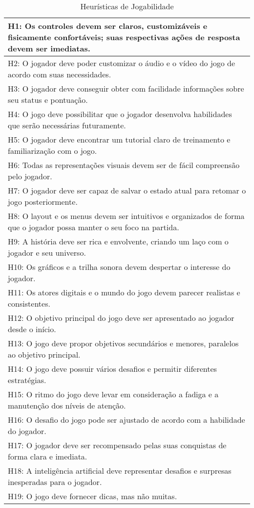 \begin{table}[H]
\centering
\caption{Heurísticas de Jogabilidade}
\label{tab:heuristica}
\begin{tabular}{|p{15.5cm}|}
\hline
H1: Os controles devem ser claros, customizáveis e fisicamente confortáveis; suas respectivas ações de resposta devem ser imediatas. \\ \hline
H2: O jogador deve poder customizar o áudio e o vídeo do jogo de acordo com suas necessidades.                                       \\ \hline
H3: O jogador deve conseguir obter com facilidade informações sobre seu status e pontuação.                                          \\ \hline
H4: O jogo deve possibilitar que o jogador desenvolva habilidades que serão necessárias futuramente.                                 \\ \hline
H5: O jogador deve encontrar um tutorial claro de treinamento e familiarização com o jogo.                                           \\ \hline
H6: Todas as representações visuais devem ser de fácil compreensão pelo jogador.                                                     \\ \hline
H7: O jogador deve ser capaz de salvar o estado atual para retomar o jogo posteriormente.                                            \\ \hline
H8: O layout e os menus devem ser intuitivos e organizados de forma que o jogador possa manter o seu foco na partida.                \\ \hline
H9: A história deve ser rica e envolvente, criando um laço com o jogador e seu universo. \\ \hline
H10: Os gráficos e a trilha sonora devem despertar o interesse do jogador. \\ \hline
H11: Os atores digitais e o mundo do jogo devem parecer realistas e consistentes. \\ \hline
H12: O objetivo principal do jogo deve ser apresentado ao jogador desde o início. \\ \hline
H13: O jogo deve propor objetivos secundários e menores, paralelos ao objetivo principal. \\ \hline
H14: O jogo deve possuir vários desafios e permitir diferentes estratégias. \\ \hline
H15: O ritmo do jogo deve levar em consideração a fadiga e a manutenção dos níveis de atenção. \\ \hline
H16: O desafio do jogo pode ser ajustado de acordo com a habilidade do jogador. \\ \hline
H17: O jogador deve ser recompensado pelas suas conquistas de forma clara e imediata. \\ \hline
H18: A inteligência artificial deve representar desafios e surpresas inesperadas para o jogador. \\ \hline
H19: O jogo deve fornecer dicas, mas não muitas. \\ \hline
\end{tabular}
\end{table}

